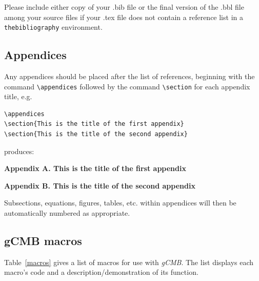\documentclass{gCMB2e}
\begin{document}
Please include either copy of your .bib file or the final version of the .bbl file among your source files if your .tex file does not contain a reference list in a \texttt{thebibliography} environment.


\subsection{Appendices}\label{appendices}

Any appendices should be placed after the list of references, beginning with the
command \verb"\appendices" followed by the command \verb"\section"
for each appendix title, e.g.
%
\begin{verbatim}
\appendices
\section{This is the title of the first appendix}
\section{This is the title of the second appendix}
\end{verbatim}

\noindent produces:\medskip

\noindent\textbf{Appendix A. This is the title of the first appendix}\medskip

\noindent\textbf{Appendix B. This is the title of the second appendix}\medskip

Subsections, equations, figures, tables, etc. within
appendices will then be automatically numbered as appropriate.


\subsection{{\bi gCMB} macros}

Table~\ref{macros} gives a list of macros for use with {\it gCMB}. The list displays each macro's code and a
description/demonstration of its function.

\begin{table} 
\label{macros}
\end{table}
\end{document}
